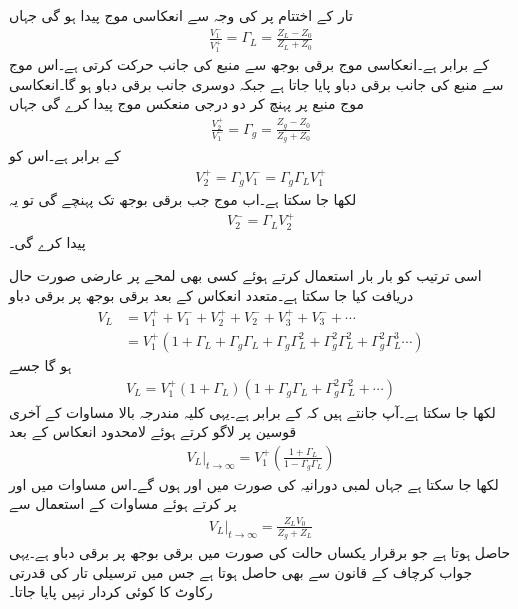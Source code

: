 تار کے اختتام پر  کی وجہ سے انعکاسی موج  پیدا ہو گی جہاں
\begin{align*}
\frac{V_1^-}{V_1^+}=\Gamma_L=\frac{Z_L-Z_0}{Z_L+Z_0}
\end{align*}
 کے برابر ہے۔انعکاسی موج برقی بوجھ سے منبع کی جانب حرکت کرتی ہے۔اس موج سے منبع کی جانب  برقی دباو پایا جاتا ہے جبکہ دوسری جانب  برقی دباو ہو گا۔انعکاسی موج  منبع پر پہنچ کر دو درجی منعکس موج  پیدا کرے گی جہاں
\begin{align*}
\frac{V_2^+}{V_1^-}=\Gamma_g=\frac{Z_g-Z_0}{Z_g+Z_0}
\end{align*}
کے برابر ہے۔اس کو
\begin{align*}
V_2^+=\Gamma_g V_1^-=\Gamma_g \Gamma_L V_1^+
\end{align*}
لکھا جا سکتا ہے۔اب  موج جب برقی بوجھ تک پہنچے گی تو یہ 
\begin{align*}
V_2^-=\Gamma_L V_2^+
\end{align*}
 پیدا کرے گی۔

اسی ترتیب کو بار بار استعمال کرتے ہوئے کسی بھی لمحے پر عارضی صورت حال دریافت کیا جا سکتا ہے۔متعدد انعکاس کے بعد برقی بوجھ پر برقی دباو
\begin{align*}
V_L&=V_1^+ + V_1^- + V_2^+ + V_2^- + V_3^+ + V_3^- + \cdots\\
&=V_1^+ (1+\Gamma_L + \Gamma_g \Gamma_L + \Gamma_g \Gamma_L ^2+\Gamma_g^2 \Gamma_L^2+\Gamma_g^2 \Gamma_L^3\cdots )
\end{align*}
ہو گا جسے
\begin{align*}
V_L=V_1^+(1+\Gamma_L)(1+\Gamma_g \Gamma_L+\Gamma_g^2 \Gamma_L^2+\cdots)
\end{align*}
لکھا جا سکتا ہے۔آپ جانتے ہیں کہ  کے برابر ہے۔یہی کلیہ مندرجہ بالا مساوات کے آخری قوسین پر لاگو کرتے ہوئے  لامحدود انعکاس کے بعد
\begin{align*}
\left. V_L \right|_{t \to \infty}=V_1^+\left(\frac{1+\Gamma_L}{1-\Gamma_g \Gamma_L}\right) 
\end{align*}
لکھا جا سکتا ہے جہاں لمبی دورانیہ   کی صورت میں   اور  ہوں گے۔اس مساوات میں  اور  پر کرتے ہوئے مساوات  کے استعمال  سے
\begin{align*}
\left. V_L \right|_{t \to \infty}=\frac{Z_L V_0}{Z_g+Z_L}
\end{align*}
حاصل ہوتا ہے جو برقرار یکساں حالت کی صورت میں برقی بوجھ پر برقی دباو ہے۔یہی جواب کرچاف کے قانون سے بھی حاصل ہوتا ہے جس میں ترسیلی تار کی قدرتی رکاوٹ کا کوئی کردار نہیں پایا جاتا۔

